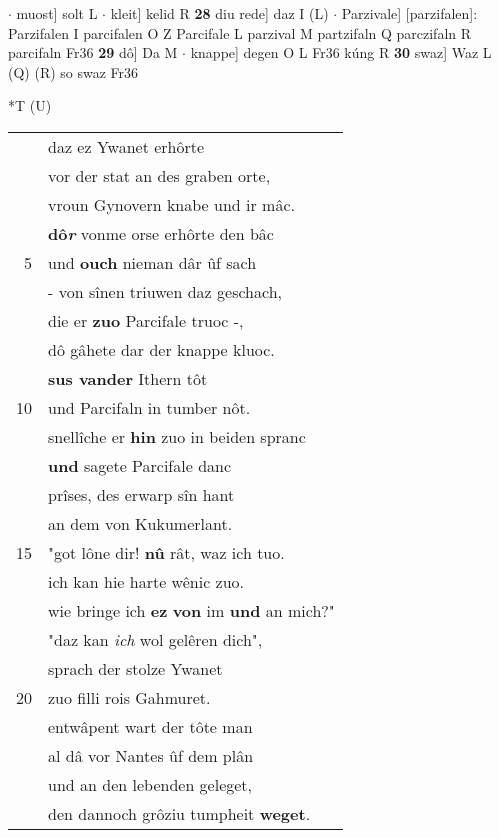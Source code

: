 \documentclass[8pt,a4paper,notitlepage]{article}
\begin{document}
\begin{table}[ht]
\begin{minipage}[t]{0.5\linewidth}
$\cdot$ muost] solt L  $\cdot$ kleit] kelid R \textbf{28} diu rede] daz I (L)  $\cdot$ Parzivale] [parzifalen]: Parzifalen I parcifalen O Z Parcifale L parzival M partzifaln Q parczifaln R parcifaln Fr36 \textbf{29} dô] Da M  $\cdot$ knappe] degen O L Fr36 kúng R \textbf{30} swaz] Waz L (Q) (R) so swaz Fr36 \newline
\end{minipage}
\hspace{0.5cm}
\begin{minipage}[t]{0.5\linewidth}
\small
\begin{center}*T (U)
\end{center}
\begin{tabular}{rl}
 & daz ez Ywanet erhôrte\\ 
 & vor der stat an des graben orte,\\ 
 & vroun Gynovern knabe und ir mâc.\\ 
 & \textbf{dô\textit{r}} vonme orse erhôrte den bâc\\ 
5 & und \textbf{ouch} nieman dâr ûf sach\\ 
 & - von sînen triuwen daz geschach,\\ 
 & die er \textbf{zuo} Parcifale truoc -,\\ 
 & dô gâhete dar der knappe kluoc.\\ 
 & \textbf{sus vander} Ithern tôt\\ 
10 & und Parcifaln in tumber nôt.\\ 
 & snellîche er \textbf{hin} zuo in beiden spranc\\ 
 & \textbf{und} sagete Parcifale danc\\ 
 & prîses, des erwarp sîn hant\\ 
 & an dem von Kukumerlant.\\ 
15 & "got lône dir! \textbf{nû} rât, waz ich tuo.\\ 
 & ich kan hie harte wênic zuo.\\ 
 & wie bringe ich \textbf{ez} \textbf{von} im \textbf{und} an mich?"\\ 
 & "daz kan \textit{ich} wol gelêren dich",\\ 
 & sprach der stolze Ywanet\\ 
20 & zuo filli rois Gahmuret.\\ 
 & entwâpent wart der tôte man\\ 
 & al dâ vor Nantes ûf dem plân\\ 
 & und an den lebenden geleget,\\ 
 & den dannoch grôziu tumpheit \textbf{weget}.\\ 

\end{tabular}
\end{minipage}
\end{table}
\end{document}
